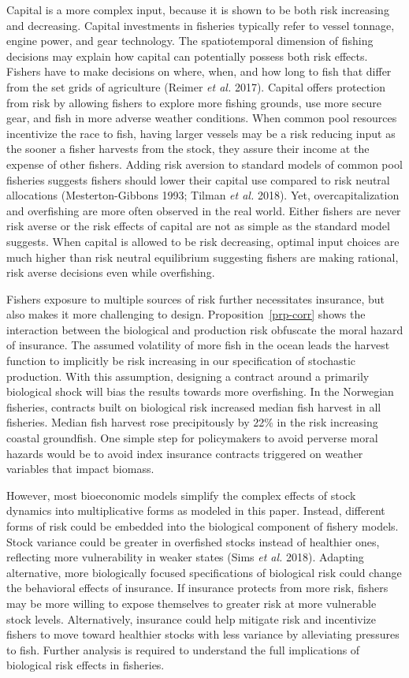 \documentclass[
  letterpaper,
  DIV=11,
  numbers=noendperiod]{scrartcl}
\theoremstyle{plain}
\theoremstyle{plain}
\theoremstyle{remark}
\begin{document}
Capital is a more complex input, because it is shown to be both risk
increasing and decreasing. Capital investments in fisheries typically
refer to vessel tonnage, engine power, and gear technology. The
spatiotemporal dimension of fishing decisions may explain how capital
can potentially possess both risk effects. Fishers have to make
decisions on where, when, and how long to fish that differ from the set
grids of agriculture (Reimer \emph{et al.} 2017). Capital offers
protection from risk by allowing fishers to explore more fishing
grounds, use more secure gear, and fish in more adverse weather
conditions. When common pool resources incentivize the race to fish,
having larger vessels may be a risk reducing input as the sooner a
fisher harvests from the stock, they assure their income at the expense
of other fishers. Adding risk aversion to standard models of common pool
fisheries suggests fishers should lower their capital use compared to
risk neutral allocations (Mesterton-Gibbons 1993; Tilman \emph{et al.}
2018). Yet, overcapitalization and overfishing are more often observed
in the real world. Either fishers are never risk averse or the risk
effects of capital are not as simple as the standard model suggests.
When capital is allowed to be risk decreasing, optimal input choices are
much higher than risk neutral equilibrium suggesting fishers are making
rational, risk averse decisions even while overfishing.

Fishers exposure to multiple sources of risk further necessitates
insurance, but also makes it more challenging to design.
Proposition~\ref{prp-corr} shows the interaction between the biological
and production risk obfuscate the moral hazard of insurance. The assumed
volatility of more fish in the ocean leads the harvest function to
implicitly be risk increasing in our specification of stochastic
production. With this assumption, designing a contract around a
primarily biological shock will bias the results towards more
overfishing. In the Norwegian fisheries, contracts built on biological
risk increased median fish harvest in all fisheries. Median fish harvest
rose precipitously by 22\% in the risk increasing coastal groundfish.
One simple step for policymakers to avoid perverse moral hazards would
be to avoid index insurance contracts triggered on weather variables
that impact biomass.

However, most bioeconomic models simplify the complex effects of stock
dynamics into multiplicative forms as modeled in this paper. Instead,
different forms of risk could be embedded into the biological component
of fishery models. Stock variance could be greater in overfished stocks
instead of healthier ones, reflecting more vulnerability in weaker
states (Sims \emph{et al.} 2018). Adapting alternative, more
biologically focused specifications of biological risk could change the
behavioral effects of insurance. If insurance protects from more risk,
fishers may be more willing to expose themselves to greater risk at more
vulnerable stock levels. Alternatively, insurance could help mitigate
risk and incentivize fishers to move toward healthier stocks with less
variance by alleviating pressures to fish. Further analysis is required
to understand the full implications of biological risk effects in
fisheries.
\end{document}
